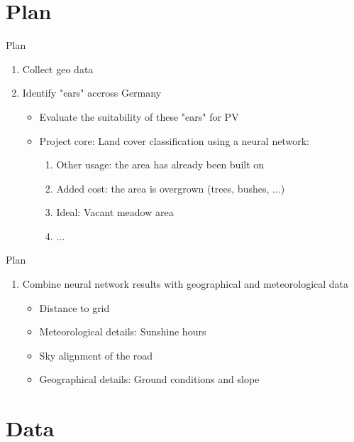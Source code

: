 \documentclass[
  ignorenonframetext,
]{beamer}
\begin{document}
\hypertarget{plan}{%
\section{Plan}\label{plan}}

\begin{frame}{Plan}
\protect\hypertarget{plan-1}{}
\begin{enumerate}
\item Collect geo data
\item Identify "ears" accross Germany
\begin{itemize}
\item Evaluate the suitability of these "ears" for PV
\item Project core: Land cover classification using a neural network:
\begin{enumerate}
\item Other usage: the area has already been built on
\item Added cost: the area is overgrown (trees, bushes, ...)
\item Ideal: Vacant meadow area
\item ...
\end{enumerate}
\end{itemize}
\end{enumerate}
\end{frame}

\begin{frame}{Plan}
\protect\hypertarget{plan-2}{}
\begin{enumerate}[3]
\item Combine neural network results with geographical and meteorological data
\begin{itemize}
\item Distance to grid
\item Meteorological details: Sunshine hours 
\item Sky alignment of the road
\item Geographical details: Ground conditions and slope
\end{itemize}
\end{enumerate}
\end{frame}

\hypertarget{data}{%
\section{Data}\label{data}}
\end{document}

